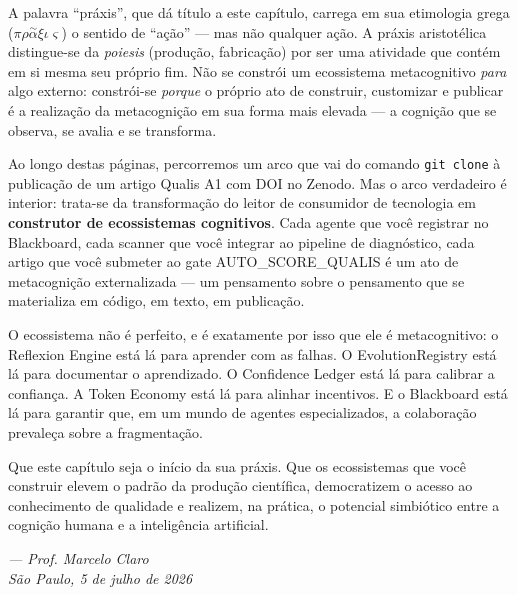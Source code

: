 A palavra ``práxis'', que dá título a este capítulo, carrega em sua etimologia grega ($\pi\rho\overset{\sim}{\alpha}\xi\iota\varsigma$) o sentido de ``ação'' — mas não qualquer ação. A práxis aristotélica distingue-se da \textit{poiesis} (produção, fabricação) por ser uma atividade que contém em si mesma seu próprio fim. Não se constrói um ecossistema metacognitivo \textit{para} algo externo: constrói-se \textit{porque} o próprio ato de construir, customizar e publicar é a realização da metacognição em sua forma mais elevada — a cognição que se observa, se avalia e se transforma.

Ao longo destas páginas, percorremos um arco que vai do comando \texttt{git clone} à publicação de um artigo Qualis A1 com DOI no Zenodo. Mas o arco verdadeiro é interior: trata-se da transformação do leitor de consumidor de tecnologia em \textbf{construtor de ecossistemas cognitivos}. Cada agente que você registrar no Blackboard, cada scanner que você integrar ao pipeline de diagnóstico, cada artigo que você submeter ao gate AUTO\_SCORE\_QUALIS é um ato de metacognição externalizada — um pensamento sobre o pensamento que se materializa em código, em texto, em publicação.

O ecossistema não é perfeito, e é exatamente por isso que ele é metacognitivo: o Reflexion Engine está lá para aprender com as falhas. O EvolutionRegistry está lá para documentar o aprendizado. O Confidence Ledger está lá para calibrar a confiança. A Token Economy está lá para alinhar incentivos. E o Blackboard está lá para garantir que, em um mundo de agentes especializados, a colaboração prevaleça sobre a fragmentação.

Que este capítulo seja o início da sua práxis. Que os ecossistemas que você construir elevem o padrão da produção científica, democratizem o acesso ao conhecimento de qualidade e realizem, na prática, o potencial simbiótico entre a cognição humana e a inteligência artificial.

\begin{flushright}
\textit{— Prof. Marcelo Claro}\\[0.3cm]
\textit{São Paulo, 5 de julho de 2026}
\end{flushright}
